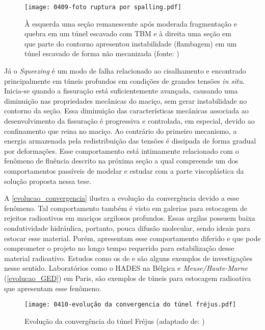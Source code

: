 \begin{figure}[H]
	\begin{center}
		\texttt{[image: 0409-foto ruptura por spalling.pdf]}
	\end{center}
	\caption{\label{foto_spalling}À esquerda uma seção remanescente após moderada fragmentação e quebra em um túnel escavado com TBM e à direita uma seção em que parte do contorno apresentou instabilidade (flambagem) em um túnel escavado de forma não mecanizada (fonte: )}
\end{figure}

Já o \textit{Squeezing} é um modo de falha relacionado ao cisalhamento e encontrado principalmente em túneis profundos em condições de grandes tensões \textit{in situ}. Inicia-se quando a fissuração está suficientemente avançada, causando uma diminuição nas propriedades mecânicas do maciço, sem gerar instabilidade no contorno da seção. Essa diminuição das características mecânicas associada ao desenvolvimento da fissuração é progressiva e controlada, em especial, devido ao confinamento que reina no maciço. Ao contrário do primeiro mecanismo, a energia armazenada pela redistribuição das tensões é dissipada de forma gradual por deformações. Esse comportamento está intimamente relacionado com o fenômeno de fluência descrito na próxima seção a qual compreende um dos comportamentos passíveis de modelar e estudar com a parte viscoplástica da solução proposta nessa tese.

A \autoref{evolucao_convergencia} ilustra a evolução da convergência devido a esse fenômeno. Tal comportamento também é visto em galerias para estocagem de rejeitos radioativos em maciços argilosos profundos. Essas argilas possuem baixa condutividade hidráulica, portanto, pouca difusão molecular, sendo ideais para estocar esse material. Porém, apresentam esse comportamento diferido e que pode comprometer o projeto no longo tempo requerido para estabilização desse material radioativo. Estudos como os de  e  são alguns exemplos de investigações nesse sentido. Laboratórios como o HADES na Bélgica e \textit{Meuse/Haute-Marne} (\autoref{evolucao_GED}) em Paris, são exemplos de túneis para estocagem radioativa que apresentam esse fenômeno.

\begin{figure}[H]
	\begin{center}
		\texttt{[image: 0410-evolução da convergencia do túnel fréjus.pdf]}
	\end{center}
	\caption{\label{evolucao_convergencia}Evolução da convergência do túnel Fréjus (adaptado de: )}
\end{figure}

